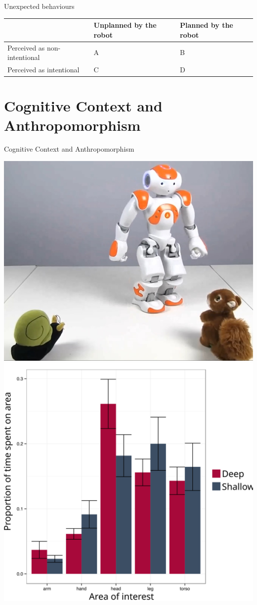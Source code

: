 \documentclass[handout,compress]{beamer}
\begin{document}

\begin{frame}{Unexpected behaviours}

    \centering
    \begin{tabular}{  >{\centering\arraybackslash}m{2cm} | >{\centering\arraybackslash}m{2cm} | >{\centering\arraybackslash}m{2cm} }
        & Unplanned by the robot & Planned by the robot \\ \hline
        Perceived as non-intentional & A  & B  \\ \hline
        Perceived as intentional &  C & D 
    \end{tabular}


\end{frame}


\section{Cognitive Context and Anthropomorphism}


{
\begin{frame}{Cognitive Context and Anthropomorphism}
    \begin{center}
        \includegraphics[width=0.45\linewidth]{stimulus-toys}
        \hspace*{1cm}
        \includegraphics[width=0.45\linewidth]{cognitive-priming}
    \end{center}
\end{frame}
}
\end{document}
